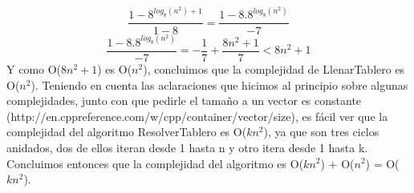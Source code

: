 \documentclass[a4paper]{article}
\begin{document}
\[
\frac{1 - 8^{log_8(n^2) + 1}}{1 - 8} = \frac{1 - 8.8^{log_8(n^2)}}{-7} 
\]
\[
\frac{1 - 8.8^{log_8(n^2)}}{-7}  = - \frac{1}{7} + \frac{8n^2 + 1}{7} < 8n^2 + 1
\]
\newline
\newline
Y como O($8n^2 + 1$) es O($n^2$), concluimos que la complejidad de LlenarTablero es O($n^2$).
\newline Teniendo en cuenta las aclaraciones que hicimos al principio sobre algunas complejidades, junto con que pedirle el tamaño a un vector es constante (http://en.cppreference.com/w/cpp/container/vector/size), es fácil ver que la complejidad del algoritmo ResolverTablero es O($kn^2$), ya que son tres ciclos anidados, dos de ellos iteran desde 1 hasta n y otro itera desde 1 hasta k.
\newline Concluimos entonces que la complejidad del algoritmo es O($kn^2$) + O($n^2$) = O($kn^2$).
\end{document}

